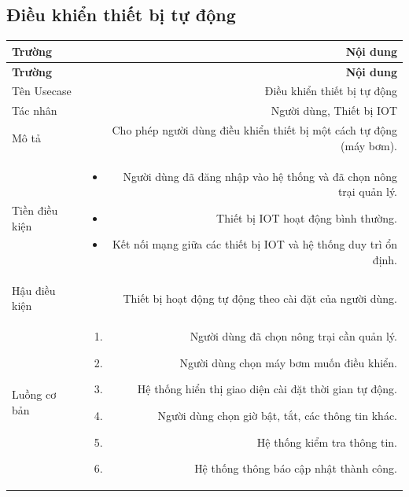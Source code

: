 \subsection{Điều khiển thiết bị tự động}
 
\begin{longtable}{|L|R|}
 
\hline
\textbf{Trường} & \textbf{Nội dung} \\ \hline
 
\endfirsthead
 
\hline
\textbf{Trường} & \textbf{Nội dung} \\ \hline
 
\endhead
 
\endfoot
 
Tên Usecase & Điều khiển thiết bị tự động \\[4pt] \hline
 
Tác nhân & Người dùng, Thiết bị IOT \\[4pt] \hline
 
Mô tả & Cho phép người dùng điều khiển thiết bị một cách tự động (máy bơm). \\[4pt] \hline
 
Tiền điều kiện &
\begin{itemize}[leftmargin=*, nosep, topsep=2pt]
  \item Người dùng đã đăng nhập vào hệ thống và đã chọn nông trại quản lý.
  \item Thiết bị IOT hoạt động bình thường.
  \item Kết nối mạng giữa các thiết bị IOT và hệ thống duy trì ổn định.
\end{itemize} \\[4pt] \hline
 
Hậu điều kiện & Thiết bị hoạt động tự động theo cài đặt của người dùng. \\[4pt] \hline
 
Luồng cơ bản &
\begin{enumerate}[leftmargin=*, nosep, topsep=2pt]
  \item Người dùng đã chọn nông trại cần quản lý.
  \item Người dùng chọn máy bơm muốn điều khiển.
  \item Hệ thống hiển thị giao diện cài đặt thời gian tự động.
  \item Người dùng chọn giờ bật, tắt, các thông tin khác.
  \item Hệ thống kiểm tra thông tin.
  \item Hệ thống thông báo cập nhật thành công.
\end{enumerate} \\[4pt] \hline
 

\end{longtable}
